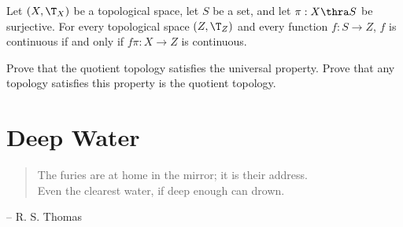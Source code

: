 \documentclass[10pt]{article}
\begin{document}
\begin{Universal property for quotient topology}
    Let $(X,{\T}_{X})$ be a topological space, let $S$ be a set, and let $\pi:X\thra S$ be surjective. For every topological space $(Z,{\T}_{Z})$ and every function $f:S\to Z$, $f$ is continuous if and only if $f\pi:X\to Z$ is continuous.
\end{Universal property for quotient topology}
\begin{center}
\end{center}
\begin{problem}
    Prove that the quotient topology satisfies the universal property. Prove that any topology satisfies this property is the quotient topology.
\end{problem}

\section{Deep Water}
\begin{quote}
    The furies are at home in the mirror; it is their address.\\
    Even the clearest water, if deep enough can drown.
\end{quote}
\hspace{10cm}-- R. S. Thomas
\end{document}
